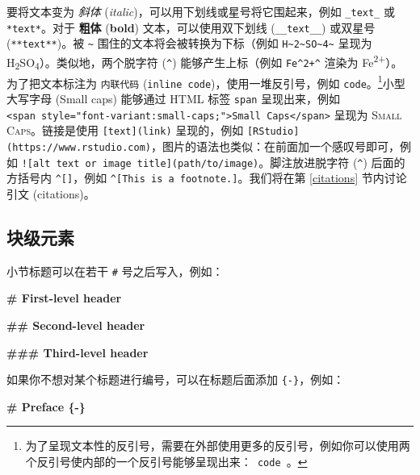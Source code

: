 \documentclass[
  12pt,
]{krantz}
\newenvironment{Shaded}{\begin{snugshade}}{\end{snugshade}}
\newcommand{\FunctionTok}[1]{\textcolor[rgb]{0.13,0.29,0.53}{\textbf{#1}}}
\theoremstyle{definition}
\theoremstyle{definition}
\theoremstyle{definition}
\theoremstyle{definition}
\theoremstyle{remark}
\begin{document}
要将文本变为 \emph{斜体} (\emph{italic})，可以用下划线或星号将它围起来，例如 \texttt{\_text\_} 或 \texttt{*text*}。对于 \textbf{粗体} (\textbf{bold}) 文本，可以使用双下划线 (\texttt{\_\_text\_\_}) 或双星号 (\texttt{**text**})。被 \texttt{\textasciitilde{}} 围住的文本将会被转换为下标（例如 \texttt{H\textasciitilde{}2\textasciitilde{}SO\textasciitilde{}4\textasciitilde{}} 呈现为 H\textsubscript{2}SO\textsubscript{4}）。类似地，两个脱字符 (\texttt{\^{}}) 能够产生上标（例如 \texttt{Fe\^{}2+\^{}} 渲染为 Fe\textsuperscript{2+}）。为了把文本标注为 \texttt{内联代码} (\texttt{inline\ code})，使用一堆反引号，例如 \texttt{\textasciigrave{}code\textasciigrave{}}。\footnote{为了呈现文本性的反引号，需要在外部使用更多的反引号，例如你可以使用两个反引号使内部的一个反引号能够呈现出来：\texttt{\textasciigrave{}\textasciigrave{}\ \textasciigrave{}code\textasciigrave{}\ \textasciigrave{}\textasciigrave{}}。}小型大写字母 (Small caps) 能够通过 HTML 标签 \texttt{span} 呈现出来，例如 \texttt{\textless{}span\ style="font-variant:small-caps;"\textgreater{}Small\ Caps\textless{}/span\textgreater{}} 呈现为 \textsc{Small Caps}。链接是使用 \texttt{{[}text{]}(link)} 呈现的，例如 \texttt{{[}RStudio{]}(https://www.rstudio.com)}，图片的语法也类似：在前面加一个感叹号即可，例如 \texttt{!{[}alt\ text\ or\ image\ title{]}(path/to/image)}。脚注放进脱字符 (\texttt{\^{}}) 后面的方括号内 \texttt{\^{}{[}{]}}，例如 \texttt{\^{}{[}This\ is\ a\ footnote.{]}}。我们将在第 \ref{citations} 节内讨论引文 (citations)。

\hypertarget{ux5757ux7ea7ux5143ux7d20}{%
\subsection{块级元素}\label{ux5757ux7ea7ux5143ux7d20}}

小节标题可以在若干 \texttt{\#} 号之后写入，例如：

\begin{Shaded}
\begin{Highlighting}[]
\FunctionTok{\# First{-}level header}

\FunctionTok{\#\# Second{-}level header}

\FunctionTok{\#\#\# Third{-}level header}
\end{Highlighting}
\end{Shaded}

如果你不想对某个标题进行编号，可以在标题后面添加 \texttt{\{-\}}，例如：

\begin{Shaded}
\begin{Highlighting}[]
\FunctionTok{\# Preface \{{-}\}}
\end{Highlighting}
\end{Shaded}
\end{document}
